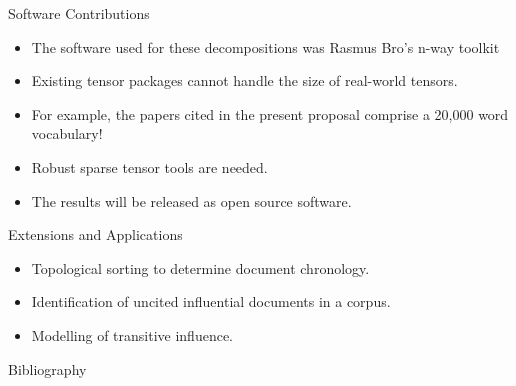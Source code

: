 \documentclass[handout]{beamer}
\begin{document}
\begin{frame}{Software Contributions}
    \begin{itemize}[<+->]
        \item The software used for these decompositions was Rasmus Bro's n-way toolkit~\cite{andersson2000}
        \item Existing tensor packages cannot handle the size of real-world tensors.
        \item For example, the papers cited in the present proposal comprise a 20,000 word vocabulary!
        \item Robust sparse tensor tools are needed.
        \item The results will be released as open source software.
    \end{itemize}
\end{frame}

\begin{frame}{Extensions and Applications}
    \begin{itemize}[<+->]
        \item Topological sorting to determine document chronology.
        \item Identification of uncited influential documents in a corpus.
        \item Modelling of transitive influence.
    \end{itemize}
\end{frame}

\begin{frame}[allowframebreaks]{Bibliography}
{}

\end{frame}
\end{document}
